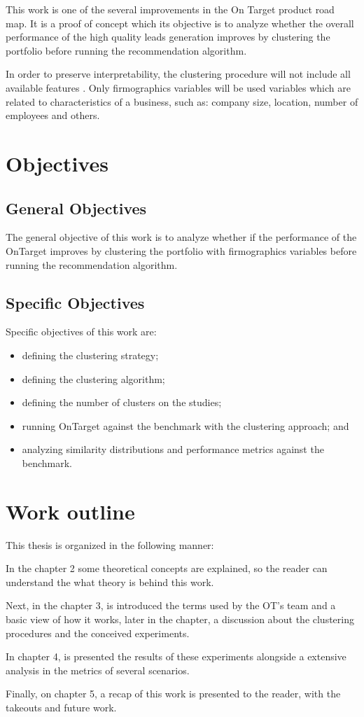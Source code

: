 This work is one of the several improvements in the On Target product road map. It is a proof of concept which its objective is to analyze whether the overall performance of the high quality leads generation improves by clustering the portfolio before running the recommendation algorithm. 

In order to preserve interpretability, the clustering procedure will not include all available features . Only firmographics variables will be used\cite{wikipedia_firmographics} variables which are related to characteristics of a business, such as: company size, location, number of employees and others.


\section{Objectives}

\subsection{General Objectives}

The general objective of this work is to analyze whether if the performance of the OnTarget improves by clustering the portfolio with firmographics variables before running the recommendation algorithm.

\subsection{Specific Objectives}

Specific objectives of this work are:

\begin{itemize}
    \item defining the clustering strategy;
	\item defining the clustering algorithm;
    \item defining the number of clusters on the studies;
    \item running OnTarget against the benchmark with the clustering approach; and
    \item analyzing similarity distributions and performance metrics against the benchmark.
\end{itemize}


\section{Work outline}

This thesis is organized in the following manner: 

In the chapter 2 some theoretical concepts are explained, so the reader can understand the what theory is behind this work. 

Next, in the chapter 3, is introduced the terms used by the OT's team and a basic view of how it works, later in the chapter, a discussion about the clustering procedures and the conceived experiments.

In chapter 4, is presented the results of these experiments alongside a extensive analysis in the metrics of several scenarios. 
 
Finally, on chapter 5, a recap of this work is presented to the reader, with the takeouts and future work. 